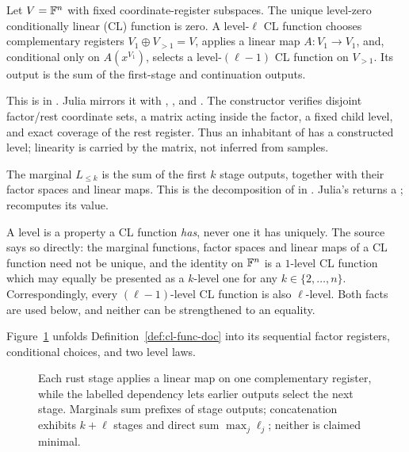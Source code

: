 \begin{definition}
\label{def:cl-func-doc}
Let \(V=\mathbb F^n\) with fixed coordinate-register subspaces.  The unique level-zero
conditionally linear (CL) function is zero.  A level-\(\ell\) CL function
chooses complementary registers \(V_1\oplus V_{>1}=V\), applies a linear map
\(A:V_1\to V_1\), and, conditional only on \(A(x^{V_1})\), selects a
level-\((\ell-1)\) CL function on \(V_{>1}\).  Its output is the sum of the
first-stage and continuation outputs.
\end{definition}
This is  in
.  Julia mirrors it with
, , and .  The constructor verifies
disjoint factor/rest coordinate sets, a matrix acting inside the factor, a
fixed child level, and exact coverage of the rest register.  Thus an inhabitant
of  has a constructed level; linearity is carried by the matrix,
not inferred from samples.

The marginal \(L_{\leq k}\) is the sum of the first \(k\) stage outputs,
together with their factor spaces and linear maps.  This is the decomposition
of  in
.  Julia's  returns a
;  recomputes its value.

A level is a property a CL function \emph{has}, never one it has uniquely.  The
source says so directly: the marginal functions, factor spaces and linear maps
of a CL function need not be unique, and the identity on \(\mathbb F^n\) is a
\(1\)-level CL function which may equally be presented as a \(k\)-level one for
any \(k\in\{2,\ldots,n\}\).  Correspondingly, every \((\ell-1)\)-level CL
function is also \(\ell\)-level.
Both facts are used below, and neither can be strengthened to an equality.

Figure~\ref{fig:cl-inductive} unfolds Definition~\ref{def:cl-func-doc} into its sequential
factor registers, conditional choices, and two level laws.
\begin{figure}[H]
\centering

\caption{Each rust stage applies a linear map on one complementary register, while the labelled dependency lets earlier outputs select the next stage.  Marginals sum prefixes of stage outputs; concatenation exhibits \(k+\ell\) stages and direct sum \(\max_j\ell_j\); neither is claimed minimal.}
\label{fig:cl-inductive}
\end{figure}

